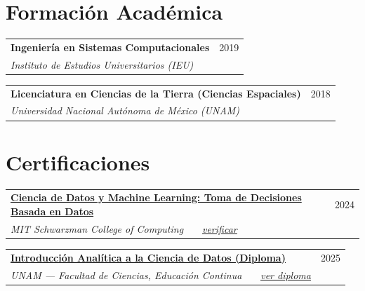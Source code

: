 \documentclass[11pt,a4paper]{article}
\makeatletter
\newcommand{\cventry}[4]{%
  \begin{tabularx}{\linewidth}{@{}X r@{}}
    \textbf{#1} & {\color{muted}#2}\\[2pt]
    {\color{muted}\itshape #3} & {\color{muted}\itshape #4}\\
  \end{tabularx}%
  \vspace{-0.05em}%
}
\makeatother
\begin{document}
\section{Formación Académica}
\cventry{Ingeniería en Sistemas Computacionales}{2019}{Instituto de Estudios Universitarios (IEU)}{}
\vspace{0.35em}
\cventry{Licenciatura en Ciencias de la Tierra (Ciencias Espaciales)}{2018}{Universidad Nacional Autónoma de México (UNAM)}{}

\section{Certificaciones}
\cventry{\href{https://olympus1.mygreatlearning.com/certificate/THUSYCVQ}{Ciencia de Datos y Machine Learning: Toma de Decisiones Basada en Datos}}{2024}{MIT Schwarzman College of Computing \, \textperiodcentered\ \, \href{https://olympus1.mygreatlearning.com/certificate/THUSYCVQ}{\underline{verificar}}}{}
\vspace{0.35em}
\cventry{\href{https://ivan31416neda.com/assets/certs/UNAM_Diplomado_Ciencia_de_Datos.pdf}{Introducción Analítica a la Ciencia de Datos (Diploma)}}{2025}{UNAM — Facultad de Ciencias, Educación Continua \, \textperiodcentered\ \, \href{https://ivan31416neda.com/assets/certs/UNAM_Diplomado_Ciencia_de_Datos.pdf}{\underline{ver diploma}}}{}
\end{document}
